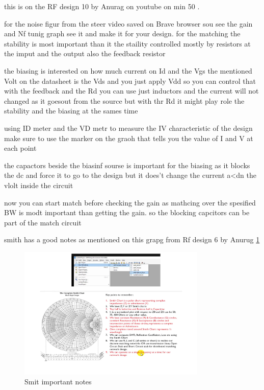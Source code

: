 \documentclass{article}
\begin{document}
\begin{itemize}
this is on the RF design 10 by Anurag on youtube on min 50 .

for the noise figur from the steer video saved on Brave browser sou see the gain and Nf tunig graph see it and make it for your design. 
for the matching the stability is most important than it the  staility controlled mostly by resistors at the imput and the output also the feedback  resistor 


the biasing is interested on how much current on Id and the Vgs the mentioned Volt on the datasheet is the Vds and you just apply Vdd so you can control that with the feedback and the Rd you can use just inductors and the current will not changed as it goesout from the source but with thr Rd it might play role the stability and the biasing at the sames time 


using ID meter and the VD metr to measure the IV characteristic of the design make sure to use the marker on the graoh that tells you the value of I and V  at each point


the capactors beside the biasinf sourse is important for the biasing as it  blocks the dc and force it to go to the  design but it does't change the current a<dn the vlolt inside the circuit 



now you can start match before checking the gain as mathcing over the spesified BW is modt important than getting the gain. so the blocking capcitors can be part of the match circuit 

smith has a good notes as mentioned on this grapg from Rf design 6 by Anurug \cref{smith tips}
\begin{figure}[H]
    \centering
    \includegraphics[width=0.8\textwidth]{figures/Anurug rf6_1.pdf}
    \caption{Smit important notes }
    \label{smith tips}
\end{figure}


\end{itemize}
\end{document}
